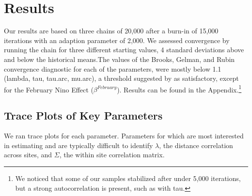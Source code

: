 \documentclass[12pt]{article}
\begin{document}



\section{Results}
\label{sec:results}
Our results are based on three chains of 20,000 after a burn-in of 15,000 iterations with an adaption parameter of 2,000. We assessed convergence by running the chain for three different starting values, 4 standard deviations above and below the historical means.The values of the Brooks, Gelman, and Rubin convergence diagnostic for each of the parameters, were mostly below 1.1 (lambda, tau, tau.arc, mu.arc), a threshold suggested by \citet{Gamerman1997} as satisfactory, except for the February Nino Effect ($\beta^{February}$). Results can be found in the Appendix.\footnote{We noticed that some of our samples stabilized after under 5,000 iterations, but a strong autocorrelation is present, such as with tau.}  



\subsection{Trace Plots of Key Parameters}

We ran trace plots for each parameter. Parameters for which are most interested in estimating and are typically difficult to identify $\lambda$, the distance correlation across sites, and $\Sigma$, the within site correlation matrix. 

\end{document}
